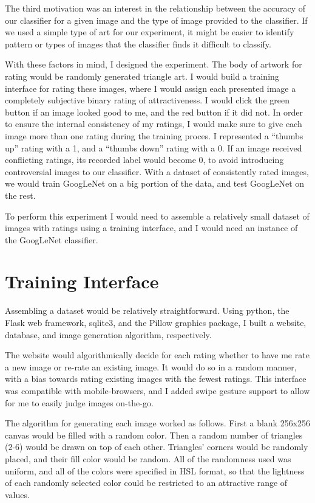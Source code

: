 \documentclass[midd]{thesis}
\begin{document}
The third motivation was an interest in the relationship between the accuracy of our classifier for a given image and the type of image provided to the classifier. If we used a simple type of art for our experiment, it might be easier to identify pattern or types of images that the classifier finds it difficult to classify.

With these factors in mind, I designed the experiment. The body of artwork for rating would be randomly generated triangle art. I would build a training interface for rating these images, where I would assign each presented image a completely subjective binary rating of attractiveness. I would click the green button if an image looked good to me, and the red button if it did not. In order to ensure the internal consistency of my ratings, I would make sure to give each image more than one rating during the training proces. I represented a ``thumbs up'' rating with a 1, and a ``thumbs down'' rating with a 0. If an image received conflicting ratings, its recorded label would become 0, to avoid introducing controversial images to our classifier. With a dataset of consistently rated images, we would train GoogLeNet on a big portion of the data, and test GoogLeNet on the rest.

To perform this experiment I would need to assemble a relatively small dataset of images with ratings using a training interface, and I would need an instance of the GoogLeNet classifier.

\section{Training Interface}

Assembling a dataset would be relatively straightforward. Using python, the Flask web framework, sqlite3, and the Pillow graphics package, I built a website, database, and image generation algorithm, respectively.

The website would algorithmically decide for each rating whether to have me rate a new image or re-rate an existing image. It would do so in a random manner, with a bias towards rating existing images with the fewest ratings. This interface was compatible with mobile-browsers, and I added swipe gesture support to allow for me to easily judge images on-the-go.

The algorithm for generating each image worked as follows. First a blank 256x256 canvas would be filled with a random color. Then a random number of triangles (2-6) would be drawn on top of each other. Triangles' corners would be randomly placed, and their fill color would be random. All of the randomness used was uniform, and all of the colors were specified in HSL format, so that the lightness of each randomly selected color could be restricted to an attractive range of values.
\end{document}
